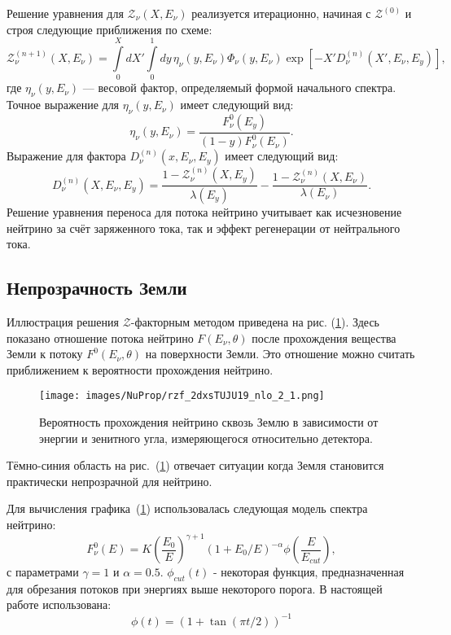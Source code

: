 Решение уравнения для $\mathcal{Z}_{\nu}(X,E_\nu)$ реализуется итерационно, начиная с $\mathcal{Z}^{(0)}$ и строя следующие приближения по схеме:
\begin{equation}
\mathcal{Z}^{(n+1)}_{\nu}(X,E_\nu) = \int\limits_0^X dX' \int\limits_0^1 dy\,\eta_{\nu}(y,E_\nu)\Phi_{\nu}(y,E_\nu)\exp\left[ -X'D^{(n)}_{\nu}(X',E_\nu,E_y) \right],
\end{equation}
где $\eta_{\nu}(y,E_\nu)$ — весовой фактор, определяемый формой начального спектра. Точное выражение для $\eta_{\nu}(y,E_\nu)$ имеет следующий вид: 
\begin{equation}
    \eta_{\nu}(y,E_\nu) = \frac{F^0_{\nu}(E_y)}{(1-y)F^0_{\nu}(E_\nu)}.
\end{equation}
Выражение для фактора $D^{(n)}_{\nu}(x, E_\nu, E_y)$ имеет следующий вид:
\begin{equation}
    D^{(n)}_{\nu}(X, E_\nu, E_y) = \frac{1-\mathcal{Z}_{\nu}^{(n)}(X, E_y)}{\lambda(E_y)} - \frac{1-\mathcal{Z}_{\nu}^{(n)}(X, E_\nu)}{\lambda(E_\nu)}.
\end{equation}
Решение уравнения переноса для потока нейтрино учитывает как исчезновение нейтрино за счёт заряженного тока, так и эффект регенерации от нейтрального тока. 

\subsection{Непрозрачность Земли}
Иллюстрация решения $\mathcal{Z}$-факторным методом приведена на  рис. (\ref{EF2}). Здесь показано отношение потока нейтрино $F(E_\nu,\theta)$  после прохождения вещества Земли к потоку $F^0(E_\nu,\theta)$ на поверхности Земли. Это  отношение можно считать приближением к вероятности прохождения нейтрино.
\begin{figure}[!h]
\centering
\texttt{[image: images/NuProp/rzf\_2dxsTUJU19\_nlo\_2\_1.png]}
\caption{Вероятность прохождения нейтрино сквозь Землю в зависимости от энергии и зенитного угла, измеряющегося относительно детектора.}
\label{EF2}
\end{figure}
Тёмно-синия область на рис.~(\ref{EF2}) отвечает ситуации когда Земля становится практически непрозрачной для нейтрино.

Для вычисления графика~(\ref{EF2}) использовалась следующая модель спектра нейтрино:
\begin{equation}
    F_{\nu}^{0}(E) = K\left(\frac{E_0}{E}\right)^{\gamma+1} (1+E_0/E)^{-\alpha}\phi\left(\frac{E}{E_{cut}}\right),
\end{equation}
с параметрами $\gamma = 1$ и $\alpha = 0.5$. $\phi_{cut}(t)$ - некоторая функция, предназначенная для обрезания потоков при энергиях выше некоторого порога. В настоящей работе использована:
\begin{equation}
    \phi(t) = (1+\tan(\pi t/2))^{-1}
\end{equation}
